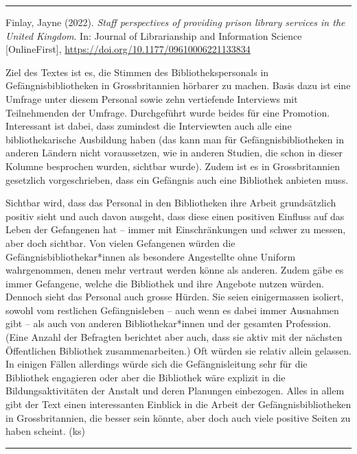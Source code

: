 \documentclass[a4paper,
fontsize=11pt,
oneside,
numbers=noperiodatend,
parskip=half-,
bibliography=totoc,
final
]{scrartcl}
\begin{document}
\begin{center}\rule{0.5\linewidth}{0.5pt}\end{center}

Finlay, Jayne (2022). \emph{Staff perspectives of providing prison
library services in the United Kingdom}. In: Journal of Librarianship
and Information Science {[}OnlineFirst{]},
\url{https://doi.org/10.1177/09610006221133834}

Ziel des Textes ist es, die Stimmen des Bibliothekspersonals in
Gefängnisbibliotheken in Grossbritannien hörbarer zu machen. Basis dazu
ist eine Umfrage unter diesem Personal sowie zehn vertiefende Interviews
mit Teilnehmenden der Umfrage. Durchgeführt wurde beides für eine
Promotion. Interessant ist dabei, dass zumindest die Interviewten auch
alle eine bibliothekarische Ausbildung haben (das kann man für
Gefängnisbibliotheken in anderen Ländern nicht voraussetzen, wie in
anderen Studien, die schon in dieser Kolumne besprochen wurden, sichtbar
wurde). Zudem ist es in Grossbritannien gesetzlich vorgeschrieben, dass
ein Gefängnis auch eine Bibliothek anbieten muss.

Sichtbar wird, dass das Personal in den Bibliotheken ihre Arbeit
grundsätzlich positiv sieht und auch davon ausgeht, dass diese einen
positiven Einfluss auf das Leben der Gefangenen hat -- immer mit
Einschränkungen und schwer zu messen, aber doch sichtbar. Von vielen
Gefangenen würden die Gefängnisbibliothekar*innen als besondere
Angestellte ohne Uniform wahrgenommen, denen mehr vertraut werden könne
als anderen. Zudem gäbe es immer Gefangene, welche die Bibliothek und
ihre Angebote nutzen würden. Dennoch sieht das Personal auch grosse
Hürden. Sie seien einigermassen isoliert, sowohl vom restlichen
Gefängnisleben -- auch wenn es dabei immer Ausnahmen gibt -- als auch
von anderen Bibliothekar*innen und der gesamten Profession. (Eine Anzahl
der Befragten berichtet aber auch, dass sie aktiv mit der nächsten
Öffentlichen Bibliothek zusammenarbeiten.) Oft würden sie relativ allein
gelassen. In einigen Fällen allerdings würde sich die Gefängnisleitung
sehr für die Bibliothek engagieren oder aber die Bibliothek wäre
explizit in die Bildungsaktivitäten der Anstalt und deren Planungen
einbezogen. Alles in allem gibt der Text einen interessanten Einblick in
die Arbeit der Gefängnisbibliotheken in Grossbritannien, die besser sein
könnte, aber doch auch viele positive Seiten zu haben scheint. (ks)

\begin{center}\rule{0.5\linewidth}{0.5pt}\end{center}
\end{document}
